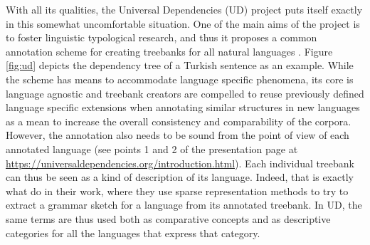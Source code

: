 \documentclass[11pt]{article}
\begin{document}
With all its qualities, the Universal Dependencies (UD) project \cite{UD214} puts itself exactly in this somewhat uncomfortable situation.
One of the main aims of the project is to foster linguistic typological research, and thus it proposes a common annotation scheme for creating treebanks for all natural languages \cite{UDv2}.
Figure \ref{fig:ud} depicts the dependency tree of a Turkish sentence as an example.
While the scheme has means to accommodate language specific phenomena, its core is language agnostic and treebank creators are compelled to reuse previously defined language specific extensions when annotating similar structures in new languages as a mean to increase the overall consistency and comparability of the corpora.
However, the annotation also needs to be sound from the point of view of each annotated language (see points 1 and 2 of the presentation page at \url{https://universaldependencies.org/introduction.html}).
Each individual treebank can thus be seen as a kind of description of its language.
Indeed, that is exactly what  do in their work, where they use sparse representation methods to try to extract a grammar sketch for a language from its annotated treebank.
In UD, the same terms are thus used both as comparative concepts and as descriptive categories for all the languages that express that category.
\end{document}
